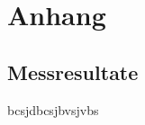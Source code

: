 \section{Anhang}\label{sec:anhang}
\subsection{Messresultate}\label{sec:messresultate}

bcsjdbcsjbvsjvbs